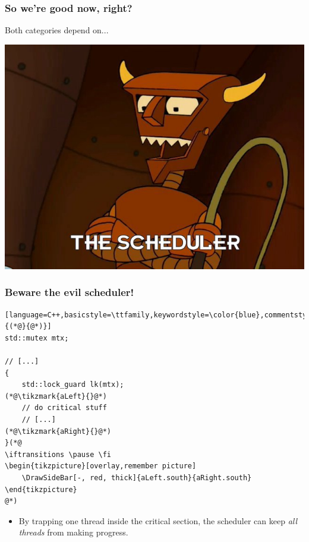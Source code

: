 \documentclass{beamer}
\newcommand{\tikzmark}[2]{%
     \tikz[overlay,remember picture] \node[text=black,
           inner sep=2pt] (#1) {#2};}
\newcommand{\HorizontalShiftForBar}{2.0em,+0.0ex}%
\newcommand{\Stub}{0.0em,-0.6ex}%
\newcommand{\DrawSideBar}[3][]{%
        \coordinate (top left)  at ($(#2)       +(\HorizontalShiftForBar)$);
        \coordinate (start)     at ($(top left) +(\Stub)$);
        \coordinate (top right) at ($(#3)       +(\HorizontalShiftForBar)$);
        \coordinate (end)       at ($(top right)+(\Stub)$);
        \draw [#1] (start) -- (top left) -- (top right) -- (end);
}%
\newif\iftransitions
\begin{document}
\begin{frame}[fragile]
  \frametitle{So we're good now, right?}

  Both categories depend on...

  \iftransitions \pause \fi

  \begin{center}
  \includegraphics[height=0.7\textheight]{resources/robot-devil-scheduler.jpg}
  \end{center}
\end{frame}


\begin{frame}[fragile]

\frametitle{Beware the evil scheduler!}

\begin{lstlisting}[language=C++,basicstyle=\ttfamily,keywordstyle=\color{blue},commentstyle=\color{teal}\itshape,showstringspaces=false,escapeinside={(*@}{@*)}]
std::mutex mtx;

// [...]
{
    std::lock_guard lk(mtx);
(*@\tikzmark{aLeft}{}@*)
    // do critical stuff
    // [...]
(*@\tikzmark{aRight}{}@*)
}(*@
\iftransitions \pause \fi
\begin{tikzpicture}[overlay,remember picture]
    \DrawSideBar[-, red, thick]{aLeft.south}{aRight.south}
\end{tikzpicture}
@*)\end{lstlisting}

\begin{itemize}
    \item By trapping one thread inside the critical section, the scheduler can keep \emph{all threads} from making progress.
\end{itemize}

\end{frame}
\end{document}
